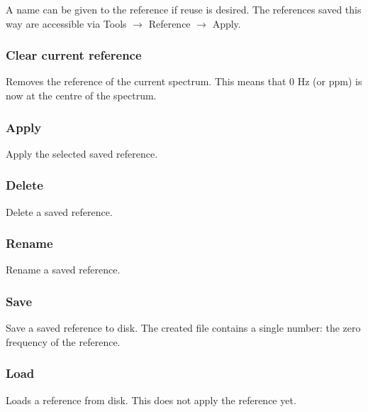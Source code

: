 \documentclass[11pt,a4paper]{article}
\begin{document}
A name can be given to the reference if reuse is desired. The references saved this way are
accessible via Tools
$\rightarrow$ Reference $\rightarrow$ Apply.


\subsubsection{Clear current reference}
Removes the reference of the current spectrum. This means that 0 Hz (or ppm) is now at the centre of the
spectrum.

\subsubsection{Apply}
Apply the selected saved reference.

\subsubsection{Delete}
Delete a saved reference.

\subsubsection{Rename}
Rename a saved reference.

\subsubsection{Save}
Save a saved reference to disk. The created file contains a single number: the zero frequency of the reference.

\subsubsection{Load}
Loads a reference from disk. This does not apply the reference yet.
\end{document}
